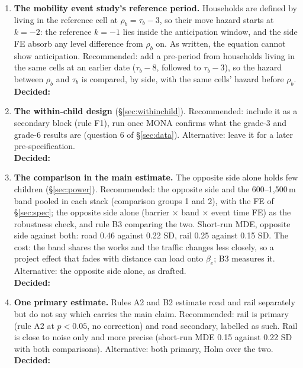 \documentclass[11pt]{article}
\begin{document}
\begin{enumerate}
  comparison group 2 and report it, rather than moving the band. If
  decision~\ref{dec:comparison} pooled it, the main estimate falls back to the opposite side
  alone.\\ \textbf{Decided:}
\item \textbf{The mobility event study's reference period.} Households are defined by living in
  the reference cell at \(\rho_b = \tau_b - 3\), so their move hazard starts at \(k = -2\): the
  reference \(k = -1\) lies inside the anticipation window, and the side FE absorb any level
  difference from \(\rho_b\) on. As written, the equation cannot show anticipation.
  Recommended: add a pre-period from households living in the same cells at an earlier date
  (\(\tau_b - 8\), followed to \(\tau_b - 3\)), so the hazard between \(\rho_b\) and \(\tau_b\)
  is compared, by side, with the same cells' hazard before \(\rho_b\).\\ \textbf{Decided:}
\item \textbf{The within-child design} (\S\ref{sec:withinchild}). Recommended: include it as a
  secondary block (rule F1), run once MONA confirms what the grade-3 and grade-6 results are
  (question 6 of \S\ref{sec:data}). Alternative: leave it for a later pre-specification.\\
  \textbf{Decided:}
\item\label{dec:comparison} \textbf{The comparison in the main estimate.} The opposite side alone
  holds few children (\S\ref{sec:power}). Recommended: the opposite side and the
  600--1,500\,m band pooled in each stack (comparison groups 1 and 2), with the FE of
  \S\ref{sec:spec}; the opposite side alone (barrier \(\times\) band \(\times\) event time FE)
  as the robustness check, and rule B3 comparing the two. Short-run MDE, opposite side against
  both: road 0.46 against 0.22 SD, rail 0.25 against 0.15 SD. The cost: the band shares the
  works and the traffic changes less closely, so a project effect that fades with distance can
  load onto \(\beta_e\); B3 measures it. Alternative: the opposite side alone, as drafted.\\
  \textbf{Decided:}
\item\label{dec:primary} \textbf{One primary estimate.} Rules A2 and B2 estimate road and rail
  separately but do not say which carries the main claim. Recommended: rail is primary (rule A2
  at \(p < 0.05\), no correction) and road secondary, labelled as such. Rail is close to noise
  only and more precise (short-run MDE 0.15 against 0.22 SD with both comparisons). Alternative:
  both primary, Holm over the two.\\ \textbf{Decided:}
\end{enumerate}
\end{document}
